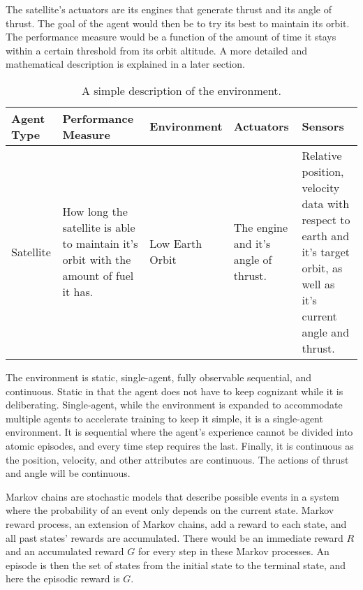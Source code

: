 The satellite's actuators are its engines that generate thrust and its angle of thrust. The goal of the agent would then be to try its best to maintain its orbit. The performance measure would be a function of the amount of time it stays within a certain threshold from its orbit altitude. A more detailed and mathematical description is explained in a later section.

\begin{table}
\caption{A simple description of the environment.}
\begin{tabularx}{\columnwidth}{|X||X|X|X|X|} \hline
Agent Type & Performance Measure & Environment & Actuators & Sensors \\ \hline
Satellite  & How long the satellite is able to maintain it's orbit with the amount of fuel it has. & 
Low Earth Orbit & The engine and it's angle of thrust. & Relative position, velocity data with respect to earth and it's target orbit, as well as it's current angle and thrust. \\ \hline
\end{tabularx}
\end{table}

The environment is static, single-agent, fully observable sequential, and continuous. Static in that the agent does not have to keep cognizant while it is deliberating. Single-agent, while the environment is expanded to accommodate multiple agents to accelerate training to keep it simple, it is a single-agent environment. It is sequential where the agent's experience cannot be divided into atomic episodes, and every time step requires the last. Finally, it is continuous as the position, velocity, and other attributes are continuous. The actions of thrust and angle will be continuous. 

Markov chains are stochastic models that describe possible events in a system where the probability of an event only depends on the current state. Markov reward process, an extension of Markov chains, add a reward to each state, and all past states' rewards are accumulated. There would be an immediate reward $R$ and an accumulated reward $G$ for every step in these Markov processes. An episode is then the set of states from the initial state to the terminal state, and here the episodic reward is $G$.

